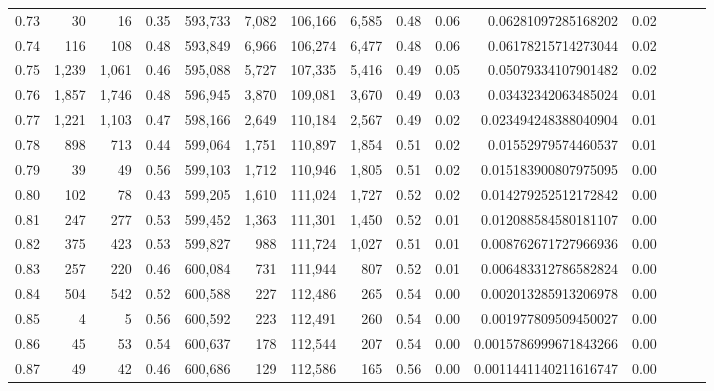 \begin{tabular}{rrrrrrrrrrrrrrr}
0.73 &      30 &      16 &  0.35 &  593,733 &    7,082 &  106,166 &    6,585 &  0.48 &  0.06 &     0.06281097285168202 &      0.02 \\
0.74 &     116 &     108 &  0.48 &  593,849 &    6,966 &  106,274 &    6,477 &  0.48 &  0.06 &     0.06178215714273044 &      0.02 \\
0.75 &   1,239 &   1,061 &  0.46 &  595,088 &    5,727 &  107,335 &    5,416 &  0.49 &  0.05 &     0.05079334107901482 &      0.02 \\
0.76 &   1,857 &   1,746 &  0.48 &  596,945 &    3,870 &  109,081 &    3,670 &  0.49 &  0.03 &     0.03432342063485024 &      0.01 \\
0.77 &   1,221 &   1,103 &  0.47 &  598,166 &    2,649 &  110,184 &    2,567 &  0.49 &  0.02 &    0.023494248388040904 &      0.01 \\
0.78 &     898 &     713 &  0.44 &  599,064 &    1,751 &  110,897 &    1,854 &  0.51 &  0.02 &     0.01552979574460537 &      0.01 \\
0.79 &      39 &      49 &  0.56 &  599,103 &    1,712 &  110,946 &    1,805 &  0.51 &  0.02 &    0.015183900807975095 &      0.00 \\
0.80 &     102 &      78 &  0.43 &  599,205 &    1,610 &  111,024 &    1,727 &  0.52 &  0.02 &    0.014279252512172842 &      0.00 \\
0.81 &     247 &     277 &  0.53 &  599,452 &    1,363 &  111,301 &    1,450 &  0.52 &  0.01 &    0.012088584580181107 &      0.00 \\
0.82 &     375 &     423 &  0.53 &  599,827 &      988 &  111,724 &    1,027 &  0.51 &  0.01 &    0.008762671727966936 &      0.00 \\
0.83 &     257 &     220 &  0.46 &  600,084 &      731 &  111,944 &      807 &  0.52 &  0.01 &    0.006483312786582824 &      0.00 \\
0.84 &     504 &     542 &  0.52 &  600,588 &      227 &  112,486 &      265 &  0.54 &  0.00 &    0.002013285913206978 &      0.00 \\
0.85 &       4 &       5 &  0.56 &  600,592 &      223 &  112,491 &      260 &  0.54 &  0.00 &    0.001977809509450027 &      0.00 \\
0.86 &      45 &      53 &  0.54 &  600,637 &      178 &  112,544 &      207 &  0.54 &  0.00 &   0.0015786999671843266 &      0.00 \\
0.87 &      49 &      42 &  0.46 &  600,686 &      129 &  112,586 &      165 &  0.56 &  0.00 &   0.0011441140211616747 &      0.00 \\

\end{tabular}
